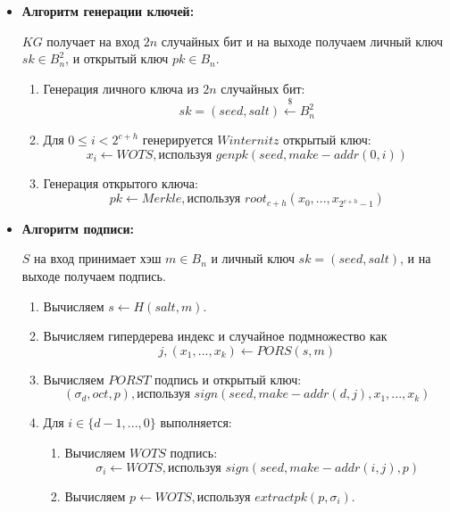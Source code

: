 \documentclass[a4paper, 14pt]{extarticle}
\begin{document}
\begin{itemize}
    \item \textbf{Алгоритм генерации ключей:}

    $KG$ получает на вход $2n$ случайных бит и на выходе получаем личный ключ $sk \in B^{2}_{n}$, и открытый ключ $pk \in B_{n}$.

    \begin{enumerate}
        \item Генерация личного ключа из $2n$ случайных бит:
        \[sk = (seed, salt) \stackrel{\$}{\leftarrow} B^{2}_{n}\]

        \item Для $0 \leq i < 2^{c+h}$ генерируется $Winternitz$ открытый ключ:
        \[x_{i} \leftarrow WOTS, \text{используя } genpk(seed, make-addr(0, i))\]

        \item Генерация открытого ключа:
        \[pk \leftarrow Merkle, \text{используя } root_{c+h}(x_{0}, ..., x_{2^{c+h} - 1})\]
    \end{enumerate}
    \newpage
    \item \textbf{Алгоритм подписи:}

    $S$ на вход принимает хэш $m \in B_{n}$ и личный ключ $sk = (seed, salt)$, и на выходе получаем подпись.

    \begin{enumerate}
        \item Вычисляем $s \leftarrow H(salt, m)$.

        \item Вычисляем гипердерева индекс и случайное подмножество как
        \[j, (x_{1}, ..., x_{k}) \leftarrow PORS(s, m)\]

        \item Вычисляем $PORST$ подпись и открытый ключ:
        \[(\sigma_{d}, oct, p), \text{используя } sign(seed, make-addr(d, j), x_{1}, ..., x_{k})\]

        \item Для $i \in \{d - 1, ..., 0\}$ выполняется:
        
        \begin{enumerate}
            \item Вычисляем $WOTS$ подпись:
            \[\sigma_{i} \leftarrow WOTS, \text{используя } sign(seed, make-addr(i,j),p)\]

            \item Вычисляем $p \leftarrow WOTS, \text{используя } extractpk(p, \sigma_{i})$.


\end{enumerate}
\end{enumerate}
\end{itemize}
\end{document}
